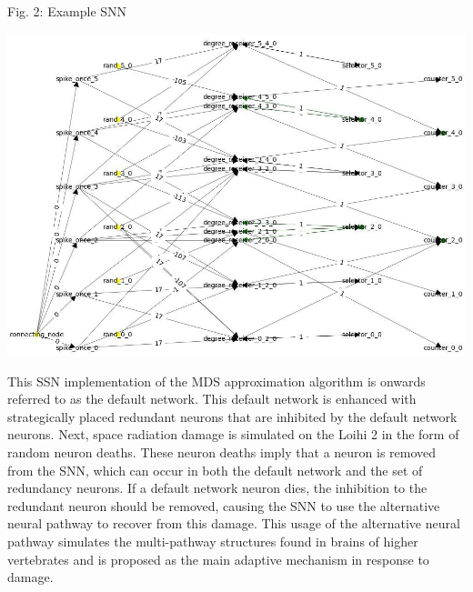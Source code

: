 \begin{rudifig}{\hsize}{Fig. 2: Example SNN}
    
    \hspace{-1em}
    \includegraphics[width=\linewidth]{latex/Images/cropped.jpeg}
    \label{fig:encoded_snn}
\end{rudifig}

\noindent This SSN implementation of the MDS approximation algorithm is onwards referred to as the default network. This default network is enhanced with strategically placed redundant neurons that are inhibited by the default network neurons. Next, space radiation damage is simulated on the Loihi 2 in the form of random neuron deaths. These neuron deaths imply that a neuron is removed from the SNN, which can occur in both the default network and the set of redundancy neurons. If a default network neuron dies, the inhibition to the redundant neuron should be removed, causing the SNN to use the alternative neural pathway to recover from this damage. This usage of the alternative neural pathway simulates the multi-pathway structures found in brains of higher vertebrates and is proposed as the main adaptive mechanism in response to damage.

